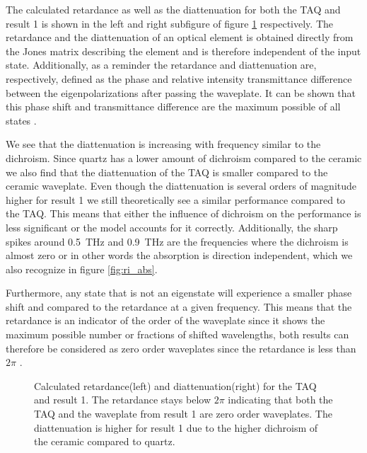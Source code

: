The calculated retardance as well as the diattenuation for both the TAQ and result 1 is shown in the left and right subfigure of figure \ref{fig:cl4_ret_diat} respectively. The retardance and the diattenuation of an optical element is obtained directly from the Jones matrix describing the element and is therefore independent of the input state. Additionally, as a reminder the retardance and diattenuation are, respectively, defined as the phase and relative intensity transmittance difference between the eigenpolarizations after passing the waveplate. It can be shown that this phase shift and transmittance difference are the maximum possible of all states \cite{Lu1994}. 

We see that the diattenuation is increasing with frequency similar to the dichroism. Since quartz has a lower amount of dichroism compared to the  ceramic we also find that the diattenuation of the TAQ is smaller compared to the ceramic waveplate. Even though the diattenuation is several orders of magnitude higher for result 1 we still theoretically see a similar performance compared to the TAQ. This means that either the influence of dichroism on the performance is less significant or the model accounts for it correctly. Additionally, the sharp spikes around \SI{0.5}{\tera \hertz} and \SI{0.9}{\tera \hertz} are the frequencies where the dichroism is almost zero or in other words the absorption is direction independent, which we also recognize in figure \ref{fig:ri_abs}. 

Furthermore, any state that is not an eigenstate will experience a smaller phase shift and compared to the retardance at a given frequency. This means that the retardance is an indicator of the order of the waveplate since it shows the maximum possible number or fractions of shifted wavelengths, both results can therefore be considered as zero order waveplates since the retardance is less than $2\pi$ \cite{Samoylov2004}. 

\begin{figure}[H]
    \centering
    
    \caption{Calculated retardance(left) and diattenuation(right) for the TAQ and result 1. The retardance stays below $2\pi$ indicating that both the TAQ and the waveplate from result 1 are zero order waveplates. The diattenuation is higher for result 1 due to the higher dichroism of the  ceramic compared to quartz.}%
    \label{fig:cl4_ret_diat}
\end{figure}

